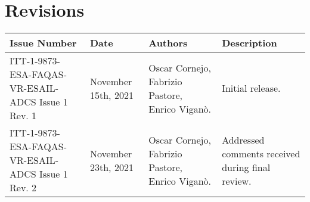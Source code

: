 
\section*{Revisions}
\label{sec:revisions}

\setlength\LTleft{0pt}
\setlength\LTright{0pt}
\scriptsize
\begin{longtable}{|p{2cm}|p{2cm}|p{2cm}|p{7cm}|@{}}
\label{table:codeoperators} \\
\hline
\textbf{Issue Number}&\textbf{Date}&\textbf{Authors}&\textbf{Description}\\
\hline
ITT-1-9873-ESA-FAQAS-VR-ESAIL-ADCS
Issue 1 Rev. 1&
November 15th, 2021&
Oscar Cornejo, Fabrizio Pastore, Enrico Viganò.&
\begin{minipage}{8cm}
Initial release.
\end{minipage}
\\
\hline
ITT-1-9873-ESA-FAQAS-VR-ESAIL-ADCS
Issue 1 Rev. 2&
November 23th, 2021&
Oscar Cornejo, Fabrizio Pastore, Enrico Viganò.&
\begin{minipage}{8cm}
Addressed comments received during final review.
\end{minipage}
\\
\hline




\end{longtable}
\normalsize

\clearpage
